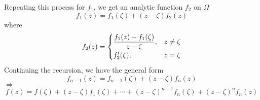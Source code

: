 Repeating this process for  $ f_1 $, we get an analytic function  $ f_2 $ on  $ \Omega $ \st 
\begin{equation}
    f_1(z)=f_1(\zeta)+(z-\zeta)f_2(z)
\end{equation} 
where 
\begin{equation}
    f_2(z)=\begin{cases}
        \displaystyle\frac{f_1(z)-f_1(\zeta)}{z-\zeta},&z\neq\zeta\\
        f_2'(\zeta),&z=\zeta
    \end{cases}
\end{equation}
Continuing the recursion, we have the general form 
\begin{equation}
    f_{n-1}(z)=f_{n-1}(\zeta)+(z-\zeta)f_n(z)
\end{equation}
 $ \Rightarrow $ 
\begin{equation}
    f(z)=f(\zeta)+(z-\zeta)f_1(\zeta)+\cdots+(z-\zeta)^{n-1}f_n(\zeta)+(z-\zeta)^nf_n(z)
\end{equation}  